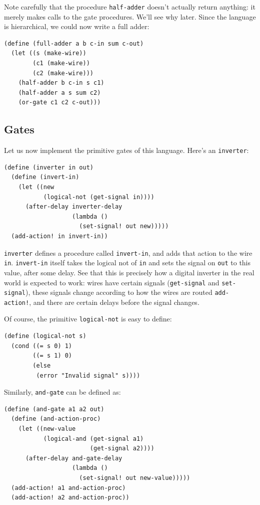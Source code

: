 \documentclass[9pt]{report}
\begin{document}
Note carefully that the procedure \texttt{half-adder} doesn't actually
return anything: it merely makes calls to the gate procedures.
We'll see why later. Since the language is hierarchical, we could
now write a full adder:

\begin{verbatim}
(define (full-adder a b c-in sum c-out)
  (let ((s (make-wire))
        (c1 (make-wire))
        (c2 (make-wire)))
    (half-adder b c-in s c1)
    (half-adder a s sum c2)
    (or-gate c1 c2 c-out)))
\end{verbatim}

\subsection{Gates}
\label{sec:org58ab8e3}

Let us now implement the primitive gates of this language. Here's
an \texttt{inverter}:

\begin{verbatim}
(define (inverter in out)
  (define (invert-in)
    (let ((new
           (logical-not (get-signal in))))
      (after-delay inverter-delay
                   (lambda ()
                     (set-signal! out new)))))
  (add-action! in invert-in))
\end{verbatim}

\texttt{inverter} defines a procedure called \texttt{invert-in}, and adds that
action to the wire \texttt{in}. \texttt{invert-in} itself takes the logical not
of \texttt{in} and sets the signal on \texttt{out} to this value, after some
delay. See that this is precisely how a digital inverter in the
real world is expected to work: wires have certain signals
(\texttt{get-signal} and \texttt{set-signal}), these signals change according to
how the wires are routed \texttt{add-action!}, and there are certain
delays before the signal changes.

Of course, the primitive \texttt{logical-not} is easy to define:

\begin{verbatim}
(define (logical-not s)
  (cond ((= s 0) 1)
        ((= s 1) 0)
        (else
         (error "Invalid signal" s))))
\end{verbatim}

Similarly, \texttt{and-gate} can be defined as:

\begin{verbatim}
(define (and-gate a1 a2 out)
  (define (and-action-proc)
    (let ((new-value
           (logical-and (get-signal a1)
                        (get-signal a2))))
      (after-delay and-gate-delay
                   (lambda ()
                     (set-signal! out new-value)))))
  (add-action! a1 and-action-proc)
  (add-action! a2 and-action-proc))
\end{verbatim}
\end{document}

